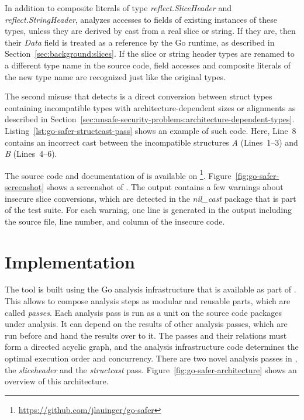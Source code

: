 

In addition to composite literals of type \textit{reflect.SliceHeader} and \textit{reflect.StringHeader}, \toolSafer{}
analyzes accesses to fields of existing instances of these types, unless they are derived by cast from a real slice or
string.
If they are, then their \textit{Data} field is treated as a reference by the Go runtime, as described in
Section~\ref{sec:background:slices}.
If the slice or string header types are renamed to a different type name in the source code, field accesses and
composite literals of the new type name are recognized just like the original types.

The second misuse that \toolSafer{} detects is a direct conversion between struct types containing incompatible types
with architecture-dependent sizes or alignments as described in
Section~\ref{sec:unsafe-security-problems:architecture-dependent-types}.
Listing~\ref{lst:go-safer-structcast-pass} shows an example of such code.
Here, Line~8 contains an incorrect cast between the incompatible structures \textit{A} (Lines~1--3) and \textit{B}
(Lines~4--6).



The source code and documentation of \toolSafer{} is available on
\github{}\footnote{\url{https://github.com/jlauinger/go-safer}}.
Figure~\ref{fig:go-safer-screenshot} shows a screenshot of \toolSafer{}.
The output contains a few warnings about insecure slice conversions, which are detected in the \textit{nil\_cast}
package that is part of the \toolSafer{} test suite.
For each warning, one line is generated in the output including the source file, line number, and column of the insecure
code.





\section{Implementation}\label{sec:go-safer:implementation}

The \toolSafer{} tool is built using the Go analysis infrastructure that is available as part of \toolVet{}.
This allows to compose analysis steps as modular and reusable parts, which are called \textit{passes}.
Each analysis pass is run as a unit on the source code packages under analysis.
It can depend on the results of other analysis passes, which are run before and hand the results over to it.
The passes and their relations must form a directed acyclic graph, and the analysis infrastructure code determines the
optimal execution order and concurrency.
There are two novel analysis passes in \toolSafer{}, the \textit{sliceheader} and the \textit{structcast} pass.
Figure~\ref{fig:go-safer-architecture} shows an overview of this architecture.


